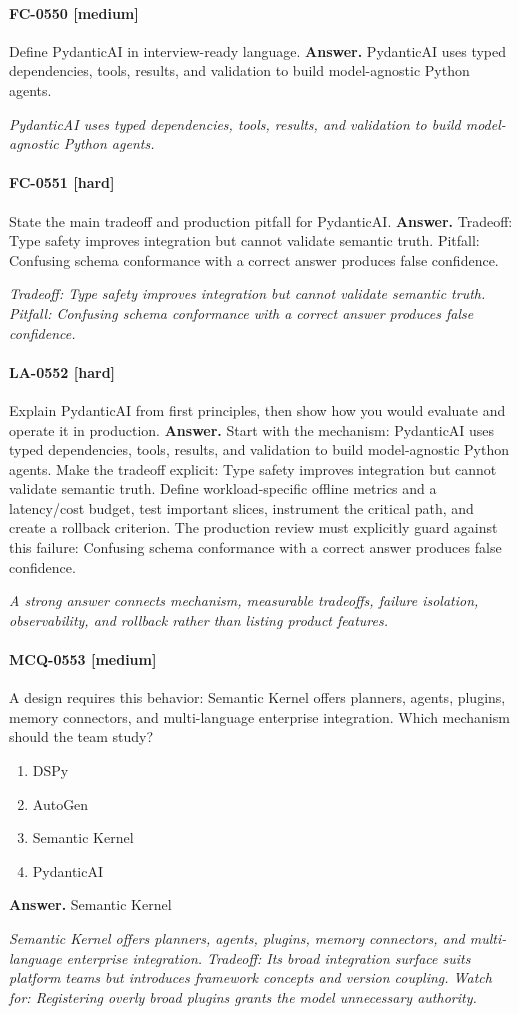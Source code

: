 \paragraph{FC-0550 [medium]} Define PydanticAI in interview-ready language.
\noindent\textbf{Answer.} PydanticAI uses typed dependencies, tools, results, and validation to build model-agnostic Python agents.
\par\textit{PydanticAI uses typed dependencies, tools, results, and validation to build model-agnostic Python agents.}
\paragraph{FC-0551 [hard]} State the main tradeoff and production pitfall for PydanticAI.
\noindent\textbf{Answer.} Tradeoff: Type safety improves integration but cannot validate semantic truth. Pitfall: Confusing schema conformance with a correct answer produces false confidence.
\par\textit{Tradeoff: Type safety improves integration but cannot validate semantic truth. Pitfall: Confusing schema conformance with a correct answer produces false confidence.}
\paragraph{LA-0552 [hard]} Explain PydanticAI from first principles, then show how you would evaluate and operate it in production.
\noindent\textbf{Answer.} Start with the mechanism: PydanticAI uses typed dependencies, tools, results, and validation to build model-agnostic Python agents. Make the tradeoff explicit: Type safety improves integration but cannot validate semantic truth. Define workload-specific offline metrics and a latency/cost budget, test important slices, instrument the critical path, and create a rollback criterion. The production review must explicitly guard against this failure: Confusing schema conformance with a correct answer produces false confidence.
\par\textit{A strong answer connects mechanism, measurable tradeoffs, failure isolation, observability, and rollback rather than listing product features.}
\paragraph{MCQ-0553 [medium]} A design requires this behavior: Semantic Kernel offers planners, agents, plugins, memory connectors, and multi-language enterprise integration. Which mechanism should the team study?
\begin{enumerate}[label=\Alph*.]
\item DSPy
\item AutoGen
\item Semantic Kernel
\item PydanticAI
\end{enumerate}
\noindent\textbf{Answer.} Semantic Kernel
\par\textit{Semantic Kernel offers planners, agents, plugins, memory connectors, and multi-language enterprise integration. Tradeoff: Its broad integration surface suits platform teams but introduces framework concepts and version coupling. Watch for: Registering overly broad plugins grants the model unnecessary authority.}
